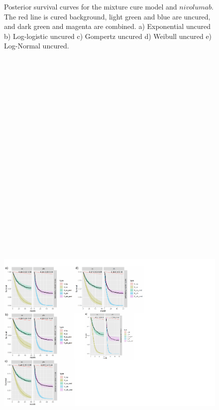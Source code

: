 \documentclass[
]{article}
\begin{document}
\begin{figure}
{}

\caption{\label{fig:NIVO}Posterior survival curves for the mixture cure model and $nivolumab$. The red line is cured background, light green and blue are uncured, and dark green and magenta are combined. a) Exponential uncured b) Log-logistic uncured c) Gompertz uncured d) Weibull uncured e) Log-Normal uncured.}\label{fig:unnamed-chunk-4}
\end{figure}

\begin{figure}

{\centering \includegraphics[width=25cm,height=40cm]{Check_mate_analysis_files/figure-latex/unnamed-chunk-5-1} 

}
\end{figure}
\end{document}
